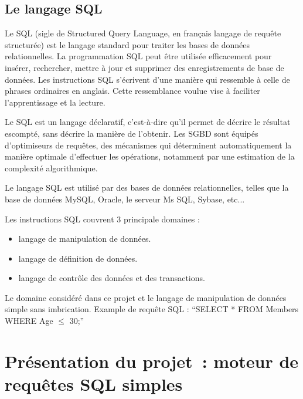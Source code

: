 \documentclass[oneside,13pt,a4paper]{report}
\begin{document}
        \section{Le langage SQL}

            Le SQL (sigle de Structured Query Language, en français langage de requête structurée) est le langage standard pour traiter les bases de données relationnelles.
            La programmation SQL peut être utilisée efficacement pour insérer, rechercher, mettre à jour et supprimer des enregistrements de base de données.
            Les instructions SQL s'écrivent d'une manière qui ressemble à celle de phrases ordinaires en anglais. Cette ressemblance voulue vise à faciliter l'apprentissage et la lecture.
            
            Le SQL est un langage déclaratif, c'est-à-dire qu'il permet de décrire le résultat escompté, sans décrire la manière de l'obtenir. 
            Les SGBD sont équipés d'optimiseurs de requêtes, des mécanismes qui déterminent automatiquement la manière optimale d'effectuer les opérations, 
            notamment par une estimation de la complexité algorithmique. 

            Le langage SQL est utilisé par des bases de données relationnelles, telles que la base de données MySQL, Oracle, le serveur Ms SQL, Sybase, etc...

            Les instructions SQL couvrent 3 principale domaines :
            \begin{itemize}
                \item langage de manipulation de données.
                \item langage de définition de données.
                \item langage de contrôle des données et des transactions.
            \end{itemize}
            \vspace{0.3cm}

            Le domaine considéré dans ce projet et le langage de manipulation de données simple sans imbrication.
            Example de requête SQL : \enquote{SELECT * FROM Members WHERE Age $ \leq $ 30;}


    \chapter{Présentation du projet : moteur de requêtes SQL simples}
\end{document}
